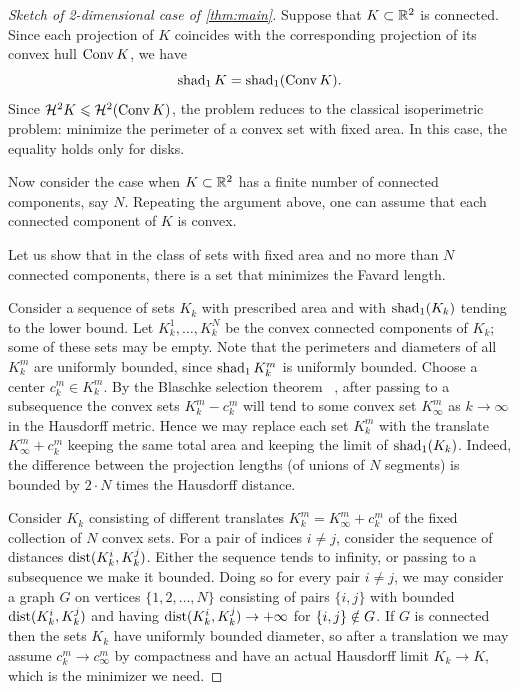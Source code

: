 \documentclass[a4paper,10pt]{article}
\begin{document}
\begin{proof}[Sketch of 2-dimensional case of \ref{thm:main}]
Suppose that $K\subset \mathbb{R}^2$ is connected.
Since each projection of $K$ coincides with the corresponding projection of its convex hull $\mathop{\rm Conv} K$, we have
\[\mathop{\rm shad}\nolimits_1K = \mathop{\rm shad}\nolimits_1(\mathop{\rm Conv} K).\]
Since $\mathcal H^2K \leqslant \mathcal H^2(\mathop{\rm Conv} K)$, the problem reduces to the classical isoperimetric problem: minimize the perimeter of a convex set with fixed area.
In this case, the equality holds only for disks.

Now consider the case when $K\subset \mathbb{R}^2$ has a finite number of connected components, say $N$.
Repeating the argument above, one can assume that each connected component of $K$ is convex.

Let us show that in the class of sets with fixed area and no more than $N$ connected components, there is a set that minimizes the Favard length.

Consider a sequence of sets $K_k$ with prescribed area and with $\mathop{\rm shad}\nolimits_1(K_k)$ tending to the lower bound.
Let $K_k^1, \ldots, K_k^N$ be the convex connected components of $K_k$; some of these sets may be empty.
Note that the perimeters and diameters of all $K_k^m$ are uniformly bounded, since $\mathop{\rm shad}\nolimits_1K_k^m$ is uniformly bounded.
Choose a center $c_k^m\in K_k^m$.
By the Blaschke selection theorem~\cite[Section~6.1]{gruber2007}%
, after passing to a subsequence the convex sets $K_k^m-c_k^m$ will tend to some convex set $K_\infty^m$ as $k\to\infty$ in the Hausdorff metric.
Hence we may replace each set $K_k^m$ with the translate $K_\infty^m + c_k^m$ keeping the same total area and keeping the limit of $\mathop{\rm shad}\nolimits_1(K_k)$.
Indeed, the difference between the projection lengths (of unions of $N$ segments) is bounded by $2\cdot N$ times the Hausdorff distance.

Consider $K_k$ consisting of different translates $K_k^m = K_\infty^m+c_k^m$ of the fixed collection of $N$ convex sets.
For a pair of indices $i\neq j$, consider the sequence of distances $\operatorname{\rm dist}(K_k^i, K_k^j)$. Either the sequence tends to infinity, or passing to a subsequence we make it bounded.
Doing so for every pair $i\neq j$, we may consider a graph $G$ on vertices $\{1,2,\ldots,N\}$ consisting of pairs $\{i,j\}$ with bounded $\operatorname{\rm dist}(K_k^i, K_k^j)$ and having $\operatorname{\rm dist}(K_k^i, K_k^j)\to +\infty$ for $\{i,j\}\z\notin G$.
If $G$ is connected then the sets $K_k$ have uniformly bounded diameter, so after a translation we may assume $c_k^m\to c_\infty^m$ by compactness and have an actual Hausdorff limit $K_k\to K$, which is the minimizer we need.


\end{proof}
\end{document}
